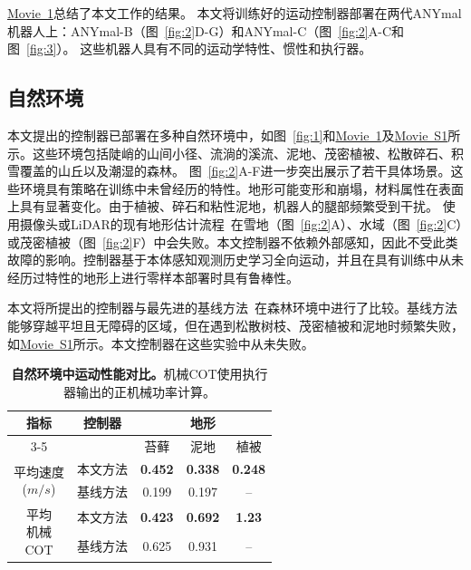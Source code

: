 \documentclass[9pt,twocolumn,twoside]{osajnl}
\begin{document}
\href{https://youtu.be/9j2a1oAHDL8}{Movie~1}总结了本文工作的结果。
本文将训练好的运动控制器部署在两代ANYmal机器人上：ANYmal-B（图~\ref{fig:2}D-G）和ANYmal-C（图~\ref{fig:2}A-C和图~\ref{fig:3}）。
这些机器人具有不同的运动学特性、惯性和执行器。

\subsection*{自然环境}

本文提出的控制器已部署在多种自然环境中，如图~\ref{fig:1}和\href{https://youtu.be/9j2a1oAHDL8}{Movie~1}及\href{https://youtu.be/txjqn8h6pjU}{Movie~S1}所示。这些环境包括陡峭的山间小径、流淌的溪流、泥地、茂密植被、松散碎石、积雪覆盖的山丘以及潮湿的森林。
图~\ref{fig:2}A-F进一步突出展示了若干具体场景。这些环境具有策略在训练中未曾经历的特性。地形可能变形和崩塌，材料属性在表面上具有显著变化。由于植被、碎石和粘性泥地，机器人的腿部频繁受到干扰。
使用摄像头或LiDAR的现有地形估计流程~\cite{fankhauser2014robot}在雪地（图~\ref{fig:2}A）、水域（图~\ref{fig:2}C）或茂密植被（图~\ref{fig:2}F）中会失败。本文控制器不依赖外部感知，因此不受此类故障的影响。控制器基于本体感知观测历史学习全向运动，并且在具有训练中从未经历过特性的地形上进行零样本部署时具有鲁棒性。

本文将所提出的控制器与最先进的基线方法~\cite{bellicoso2018dynamic,jenelten2019dynamic}在森林环境中进行了比较。基线方法能够穿越平坦且无障碍的区域，但在遇到松散树枝、茂密植被和泥地时频繁失败，如\href{https://youtu.be/txjqn8h6pjU}{Movie~S1}所示。本文控制器在这些实验中从未失败。

\begin{table}
\centering
 \begin{tabular}{|c|c|c|c|c|}
\hline
\multirow{2}{*}{指标} & \multirow{2}{*}{控制器} &  \multicolumn{3}{|c|}{地形} \\ \cline{3-5}
  & & 苔藓 & 泥地 & 植被 \\ \hline
  \multirow{2}{*}{ \parbox{2cm}{\centering 平均速度 \\ ($m/s$)}} &
本文方法 & \textbf{0.452} & \textbf{0.338} & \textbf{0.248} \\ \cline{2-5}
& 基线方法 & 0.199 & 0.197 & --  \\ \hline
  \multirow{2}{*}{ \parbox{2cm}{\centering 平均 \\ 机械 \\ COT}} &
本文方法 & \textbf{0.423} & \textbf{0.692} & \textbf{1.23} \\ \cline{2-5}
& 基线方法 & 0.625 & 0.931& --  \\ \hline
 \end{tabular}
\caption{\textbf{自然环境中运动性能对比。}机械COT使用执行器输出的正机械功率计算。}
\label{tab:1}
\end{table}
\end{document}
